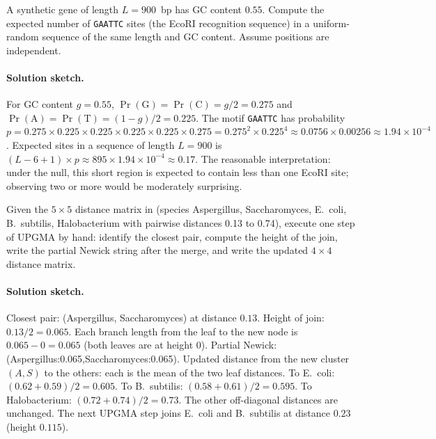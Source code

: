 \begin{exercise}
A synthetic gene of length $L=900$~bp has GC content $0.55$. Compute
the expected number of \texttt{GAATTC} sites (the EcoRI recognition
sequence) in a uniform-random sequence of the same length and GC
content. Assume positions are independent.

\paragraph{Solution sketch.}
For GC content $g=0.55$, $\Pr(\text{G}) = \Pr(\text{C}) = g/2 = 0.275$
and $\Pr(\text{A}) = \Pr(\text{T}) = (1-g)/2 = 0.225$. The motif
\texttt{GAATTC} has probability
$p = 0.275 \times 0.225 \times 0.225 \times 0.225 \times 0.225 \times
0.275 = 0.275^{2} \times 0.225^{4} \approx 0.0756 \times 0.00256
\approx 1.94 \times 10^{-4}$. Expected sites in a sequence of length
$L=900$ is $(L - 6 + 1) \times p \approx 895 \times 1.94 \times
10^{-4} \approx 0.17$. The reasonable interpretation: under the null,
this short region is expected to contain less than one EcoRI site;
observing two or more would be moderately surprising.
\end{exercise}

\begin{exercise}
Given the $5 \times 5$ distance matrix in
(species Aspergillus, Saccharomyces, E.~coli, B.~subtilis,
Halobacterium with pairwise distances 0.13 to 0.74), execute one step
of UPGMA by hand: identify the closest pair, compute the height of
the join, write the partial Newick string after the merge, and write
the updated $4 \times 4$ distance matrix.

\paragraph{Solution sketch.}
Closest pair: (Aspergillus, Saccharomyces) at distance $0.13$. Height
of join: $0.13/2 = 0.065$. Each branch length from the leaf to the new
node is $0.065 - 0 = 0.065$ (both leaves are at height 0). Partial
Newick: (Aspergillus:0.065,Saccharomyces:0.065). Updated distance
from the new cluster $(A,S)$ to the others: each is the mean of the
two leaf distances. To E.~coli: $(0.62+0.59)/2 = 0.605$.
To B.~subtilis: $(0.58+0.61)/2 = 0.595$. To Halobacterium:
$(0.72+0.74)/2 = 0.73$. The other off-diagonal distances are
unchanged. The next UPGMA step joins E.~coli and B.~subtilis at
distance $0.23$ (height $0.115$).
\end{exercise}

